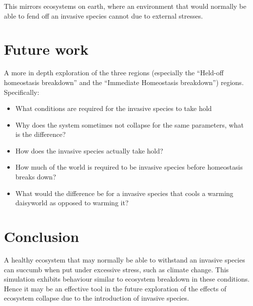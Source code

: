 \documentclass[12pt]{article}
\begin{document}
This mirrors ecosystems on earth, where an environment that would
normally be able to fend off an invasive species cannot due to
external stresses\cite{albert2000}.

\section{Future work}
A more in depth exploration of the three regions (especially the
``Held-off homeostasis breakdown'' and the ``Immediate Homeostasis
breakdown'') regions. Specifically:
\begin{itemize}
\item What conditions are required for the invasive species to take hold
\item Why does the system sometimes not collapse for the same
  parameters, what is the difference?
\item How does the invasive species actually take hold?
\item How much of the world is required to be invasive species before
  homeostasis breaks down?
\item What would the difference be for a invasive species that cools a
  warming daisyworld as opposed to warming it?
\end{itemize}

\section{Conclusion}
A healthy ecosystem that may normally be able to
withstand an invasive species can succumb when put under excessive
stress, such as climate change. This simulation exhibits behaviour
similar to ecosystem breakdown in these conditions. Hence it may be
an effective tool in the future exploration of the effects of ecosystem
collapse due to the introduction of invasive species.





\end{document}
